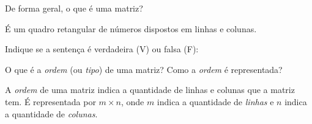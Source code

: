 \documentclass[pdftex, brazil, 12pt, oneside, addpoints, answers]{exam}
\newcommand{\vf}[1][{}]{%
  \fillin[#1][0.25in]%
}
\begin{document}
\newpage

\begin{questions}
\setlength\linefillthickness{0.2pt}

\question
De forma geral, o que é uma matriz?
\begin{solutionorlines}[0.50in]
  É um quadro retangular de números dispostos em linhas e colunas.
\end{solutionorlines}

\question
Indique se a sentença é verdadeira (V) ou falsa (F):

\question
O que é a \emph{ordem} (ou \emph{tipo}) de uma matriz? Como a \emph{ordem} é
representada?
\begin{solutionorlines}[0.75in]
  A \emph{ordem} de uma matriz indica a quantidade de linhas e colunas que a matriz
  tem. É representada por $m \times n$, onde $m$ indica a quantidade de \emph{linhas}
  e $n$ indica a quantidade de \emph{colunas}.
\end{solutionorlines}


\end{questions}
\end{document}
